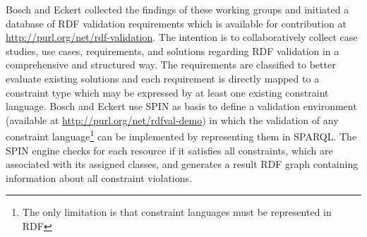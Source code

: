 \documentclass{llncs}
\begin{document}
Bosch and Eckert \cite{BoschEckert2014} collected the findings of these working groups and initiated a database of RDF validation requirements
which is available for contribution at \url{http://purl.org/net/rdf-validation}.
The intention is to collaboratively collect case studies, use cases, requirements, and solutions regarding RDF validation in a comprehensive and structured way. 
The requirements are classified to better evaluate existing solutions and each requirement is directly mapped to a constraint type which may be expressed by at least one existing constraint language.
Bosch and Eckert \cite{BoschEckert2014-2} use SPIN as basis to define a
validation environment (available at \url{http://purl.org/net/rdfval-demo}) in which the validation of any constraint language\footnote{The only limitation is that constraint languages must be represented in RDF} can be implemented by representing them in SPARQL. 
The SPIN engine checks for each resource if it satisfies all constraints, which are associated with its assigned classes, and generates a result RDF graph containing information about all constraint violations.

\end{document}
